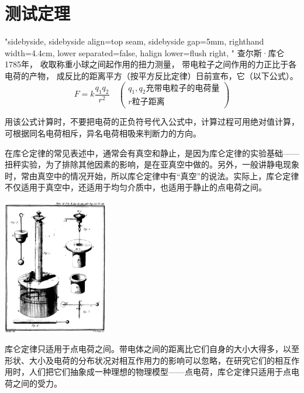 \documentclass{ctexart}
\numberwithin{theorem}{section}%
\begin{document}
\section{测试定理}

\begin{theo}[Title]
 \lipsum[1]
\end{theo}

\begin{law}[库仑定律]"sidebyside,
sidebyside align=top seam,
sidebyside gap=5mm,
righthand width=4.4cm,
lower separated=false,%
halign lower=flush right,
"%
查尔斯·库仑1785年，
收取称重小球之间起作用的扭力测量，
带电粒子之间作用的力正比于各电荷的产物，
成反比的距离平方（按平方反比定律）日前宣布，它（以下公式）。
\begin{equation*}
 F=k\frac{q_1 q_2}{r^2} \quad
\left(
\begin{array}{ll}
  q_1, q_2\text{充带电粒子的电荷量}\\[3pt]
 r\text{粒子距离}
\end{array}
\right)
\end{equation*}

用该公式计算时，不要把电荷的正负符号代入公式中，计算过程可用绝对值计算，可根据同名电荷相斥，异名电荷相吸来判断力的方向。

在库仑定律的常见表述中，通常会有真空和静止，是因为库仑定律的实验基础——扭秤实验，为了排除其他因素的影响，是在亚真空中做的。另外，一般讲静电现象时，常由真空中的情况开始，所以库仑定律中有“真空”的说法。实际上，库仑定律不仅适用于真空中，还适用于均匀介质中，也适用于静止的点电荷之间。

\tcblower
 \includegraphics[width=4.6cm]{Bcoulomb}
\end{law}

库仑定律只适用于点电荷之间。带电体之间的距离比它们自身的大小大得多，以至形状、大小及电荷的分布状况对相互作用力的影响可以忽略，在研究它们的相互作用时，人们把它们抽象成一种理想的物理模型——点电荷，库仑定律只适用于点电荷之间的受力。
\end{document}
